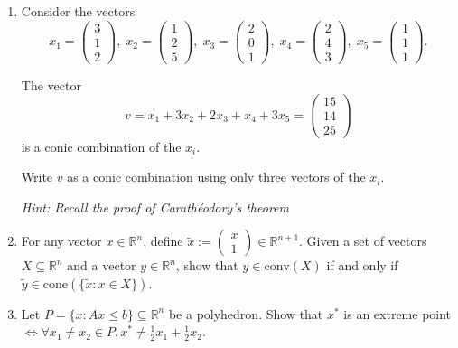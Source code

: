 \documentclass[11pt]{article}
\institute{\'Ecole Polytechnique F\'ed\'erale de Lausanne}
\newcommand{\setR}{\mathbb{R}}
\renewcommand{\leq}{\leqslant}
\begin{document}
\makeheader

\begin{enumerate}[1)]

\item Consider the vectors
$$ x_1 = \begin{pmatrix} 3 \\ 1 \\ 2\end{pmatrix},\; x_2 = \begin{pmatrix} 1 \\ 2 \\ 5 \end{pmatrix},\; x_3 = \begin{pmatrix} 2 \\ 0 \\ 1 \end{pmatrix},\; x_4 = \begin{pmatrix}  2 \\ 4 \\ 3 \end{pmatrix},\; x_5 = \begin{pmatrix}  1 \\ 1 \\ 1 \end{pmatrix}. $$

The vector 
$$ v= x_1 + 3 x_2 + 2 x_3 + x_4 + 3 x_5 =  \begin{pmatrix}  15\\ 14 \\ 25 \end{pmatrix} $$
is a conic combination of the $x_i$.

Write $v$ as a conic combination using only three vectors of the $x_i$.

\emph{Hint: Recall the proof of Carath\'eodory's theorem}

\item For any vector $x \in \setR^n$, define $\tilde{x} := \begin{pmatrix} x \\ 1 \end{pmatrix} \in \mathbb{R}^{n+1}$. 
Given a set of vectors $X \subseteq \setR^n$ and a vector $y \in \mathbb{R}^{n}$, show that $y \in \mathrm{conv}(X)$ if and only if $\tilde{y} \in \mathrm{cone}(\{\tilde{x}: x\in X\})$.

\item Let $P = \{x: Ax \leq  b\} \subseteq \setR^n$ be a polyhedron. Show that $x^\ast$ is an extreme point $\iff \forall x_1 \neq x_2 \in P, x^\ast \neq \frac{1}{2}x_1 + \frac{1}{2}x_2$. 



\end{enumerate}
\end{document}
